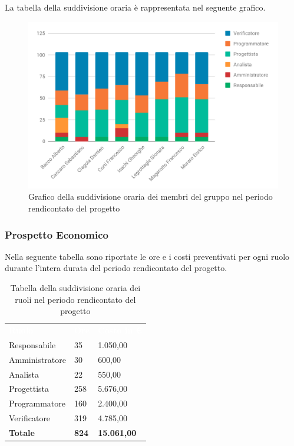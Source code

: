 La tabella della suddivisione oraria è rappresentata nel seguente grafico.
\begin{figure}[H]
	\includegraphics[width=1\linewidth]{Preventivo/grafici/TR1_2.pdf}
	\caption{Grafico della suddivisione oraria dei membri del gruppo nel periodo rendicontato del progetto}
\end{figure}

\subsubsection{Prospetto Economico}
Nella seguente tabella sono riportate le ore e i costi preventivati per ogni ruolo durante l'intera durata del periodo rendicontato del progetto.


\begin{table}[H]	
	\begin{center}
	    \begin{tabular}{C{4cm}C{1cm}C{3,5cm}}
			\textcolor{white}{\textbf{Ruolo}} & \textcolor{white}{\textbf{Ore}} & \textcolor{white}{\textbf{Costo in €}}
			\\
			Responsabile & 35 & 1.050,00 \\
			Amministratore & 30 & 600,00 \\
			Analista & 22 & 550,00 \\
			Progettista & 258 & 5.676,00 \\
			Programmatore & 160 & 2.400,00 \\
			Verificatore & 319 & 4.785,00 \\
			\textbf{Totale} & \textbf{824} & \textbf{15.061,00} \\
		\end{tabular}
	    \caption{Tabella della suddivisione oraria dei ruoli nel periodo rendicontato del progetto} \label{tab:tabellaRuoliTotale} 
	\end{center}
\end{table}



